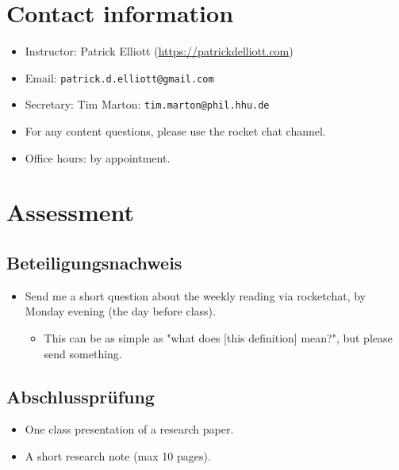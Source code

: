 \documentclass[a4paper]{scrartcl}
\begin{document}
\section{Contact information}
\label{sec:org689f7e7}

\begin{itemize}
\item Instructor: Patrick Elliott (\url{https://patrickdelliott.com})
\item Email: \texttt{patrick.d.elliott@gmail.com}
\item Secretary: Tim Marton: \texttt{tim.marton@phil.hhu.de}
\item For any content questions, please use the rocket chat channel.
\item Office hours: by appointment.
\end{itemize}
\section{Assessment}
\label{sec:org75845b3}

\subsection{Beteiligungsnachweis}
\label{sec:org00457d1}

\begin{itemize}
\item Send me a short question about the weekly reading via rocketchat, by Monday evening (the day before class).
\begin{itemize}
\item This can be as simple as "what does [this definition] mean?", but please send something.
\end{itemize}
\end{itemize}
\subsection{Abschlussprüfung}
\label{sec:org9ebf40c}

\begin{itemize}
\item One class presentation of a research paper.
\item A short research note (max 10 pages).
\end{itemize}

\printbibliography
\end{document}
